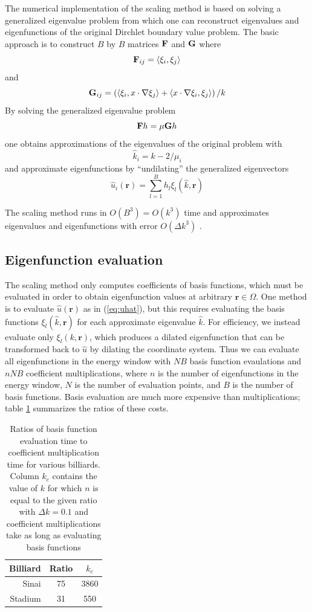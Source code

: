 \documentclass{report}
\newcommand{\rr}[0]{\mathbf{r}}
\begin{document}
The numerical implementation of the scaling method is based on solving a generalized eigenvalue problem from which one can reconstruct eigenvalues and eigenfunctions of the original Dirchlet boundary value problem. The basic approach is to construct $B$ by $B$ matrices ${\bf F}$ and ${\bf G}$ where
\[
{\bf F}_{ij} = \langle \xi_{i}, \xi_{j} \rangle
\] 
and
\[
{\bf G}_{ij} = \left( \langle \xi_{i}, x \cdot \nabla \xi_{j} \rangle + \langle x \cdot \nabla \xi_{i}, \xi_{j} \rangle \right) / k
\]
By solving the generalized eigenvalue problem
\[
{\bf F} h = \mu {\bf G} h
\]
one obtains approximations of the eigenvalues of the original problem with
\[
\hat{k}_{i} = k - 2/\mu_{i}
\]
and approximate eigenfunctions by ``undilating'' the generalized eigenvectors
\begin{equation}
  \label{eq:uhat}
  \hat{u}_{i}(\rr) = \sum_{l=1}^{B} h_{l} \xi_{l}(\hat{k}, \rr)
\end{equation}

The scaling method runs in $O(B^{3}) = O(k^{3})$ time \cite{barnett} and approximates eigenvalues and eigenfunctions with error $O({\Delta k}^{3})$ \cite[p. 32]{barnett_hassell}.

\subsection{Eigenfunction evaluation}
The scaling method only computes coefficients of basis functions, which must be evaluated in order to obtain eigenfunction values at arbitrary $\rr \in \Omega$. One method is to evaluate $\hat{u}(\rr)$ as in (\ref{eq:uhat}), but this requires evaluating the basis functions $\xi_{l}(\hat{k}, \rr)$ for each approximate eigenvalue $\hat{k}$. For efficiency, we instead evaluate only $\xi_{l}(k, \rr)$, which produces a dilated eigenfunction that can be transformed back to $\hat{u}$ by dilating the coordinate system. Thus we can evaluate all eigenfunctions in the energy window with $NB$ basis function evaulations and $nNB$ coefficient multiplications, where $n$ is the number of eigenfunctions in the energy window, $N$ is the number of evaluation points, and $B$ is the number of basis functions. Basis evaluation are much more expensive than multiplications; table \ref{tab:eval_ratios} summarizes the ratios of these costs.

\begin{table}
  \centering
  \begin{tabular}{|r|c|c|}
    \hline
    Billiard & Ratio & $k_c$ \\ \hline
    \hline
    Sinai & 75 & 3860 \\ \hline
    Stadium & 31 & 550 \\
    \hline
  \end{tabular}
  \caption{Ratios of basis function evaluation time to coefficient multiplication time for various billiards. Column $k_c$ contains the value of $k$ for which $n$ is equal to the given ratio with $\Delta k = 0.1$ and coefficient multiplications take as long as evaluating basis functions}
  \label{tab:eval_ratios}
\end{table}
\end{document}
